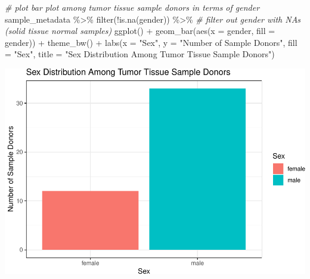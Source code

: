 \documentclass[
]{article}
\newenvironment{Shaded}{\begin{snugshade}}{\end{snugshade}}
\newcommand{\AttributeTok}[1]{\textcolor[rgb]{0.77,0.63,0.00}{#1}}
\newcommand{\CommentTok}[1]{\textcolor[rgb]{0.56,0.35,0.01}{\textit{#1}}}
\newcommand{\FunctionTok}[1]{\textcolor[rgb]{0.00,0.00,0.00}{#1}}
\newcommand{\NormalTok}[1]{#1}
\newcommand{\SpecialCharTok}[1]{\textcolor[rgb]{0.00,0.00,0.00}{#1}}
\newcommand{\StringTok}[1]{\textcolor[rgb]{0.31,0.60,0.02}{#1}}
\begin{document}
\newpage

\begin{Shaded}
\begin{Highlighting}[]
\CommentTok{\# plot bar plot among tumor tissue sample donors in terms of gender}
\NormalTok{sample\_metadata }\SpecialCharTok{\%\textgreater{}\%} 
  \FunctionTok{filter}\NormalTok{(}\SpecialCharTok{!}\FunctionTok{is.na}\NormalTok{(gender)) }\SpecialCharTok{\%\textgreater{}\%} \CommentTok{\# filter out gender with NAs (solid tissue normal samples)}
  \FunctionTok{ggplot}\NormalTok{() }\SpecialCharTok{+}
  \FunctionTok{geom\_bar}\NormalTok{(}\FunctionTok{aes}\NormalTok{(}\AttributeTok{x =}\NormalTok{ gender, }\AttributeTok{fill =}\NormalTok{ gender)) }\SpecialCharTok{+}
  \FunctionTok{theme\_bw}\NormalTok{() }\SpecialCharTok{+}
  \FunctionTok{labs}\NormalTok{(}\AttributeTok{x =} \StringTok{"Sex"}\NormalTok{, }\AttributeTok{y =} \StringTok{"Number of Sample Donors"}\NormalTok{, }\AttributeTok{fill =} \StringTok{"Sex"}\NormalTok{,}
       \AttributeTok{title =} \StringTok{"Sex Distribution Among Tumor Tissue Sample Donors"}\NormalTok{)}
\end{Highlighting}
\end{Shaded}

\includegraphics{LiuKevin_Final_Project_files/figure-latex/unnamed-chunk-6-1.pdf}

\newpage
\end{document}
